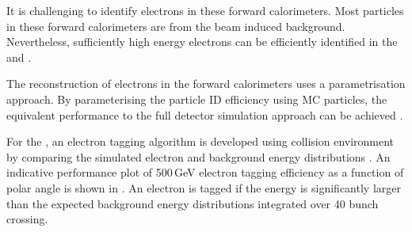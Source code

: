 It is challenging to identify electrons in these forward calorimeters.  Most particles in these forward calorimeters are from the beam induced background. Nevertheless, sufficiently high energy electrons can be efficiently identified in the \BeamCAL   and \LumiCAL \cite{sailer2012radiation}.

The reconstruction of electrons in the forward calorimeters uses  a parametrisation approach.  By parameterising the  particle ID efficiency using MC particles, the equivalent performance to the full detector simulation approach can be achieved \cite{Sailer:2017onh,Lukic:forwardElectron} .




For the \BeamCAL, an electron tagging algorithm is developed using  collision environment by comparing the simulated electron and background energy distributions \cite{Sailer:2017onh}. An indicative performance plot of 500\,GeV electron tagging efficiency as a function of polar angle is shown in . An electron is tagged if the energy is significantly larger than the expected background energy distributions integrated over 40 bunch crossing.

